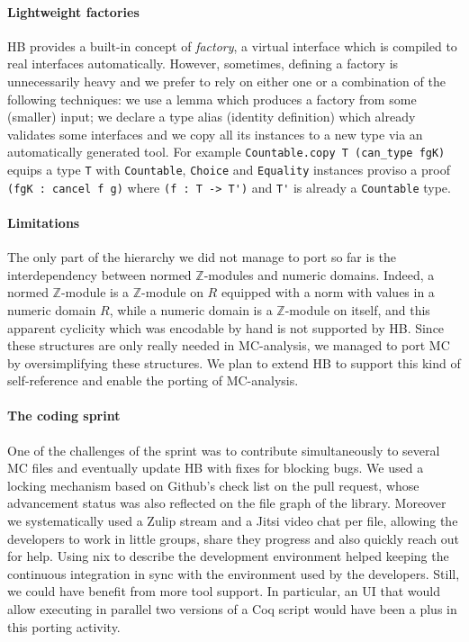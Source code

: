 \documentclass{easychair}
\def\MC{{\sf MC}}
\def\HB{{\sf HB}}
\def\newterm#1{{\it #1}}
\begin{document}
\paragraph{Lightweight factories}

\HB{} provides a built-in concept of \newterm{factory}, a virtual interface which is
compiled to real interfaces automatically. %
However, sometimes, defining a factory is
unnecessarily heavy and we prefer to rely on either one or a combination of the
following techniques: we use a lemma which produces a
factory from some (smaller) input; we declare a type alias (identity definition)
which already validates some interfaces and we copy all its instances to a new
type via an automatically generated tool. For example
\verb+Countable.copy T (can_type fgK)+ equips a type \verb+T+ with
\verb+Countable+, \verb+Choice+ and \verb+Equality+ instances proviso a
proof \verb+(fgK : cancel f g)+ where \verb+(f : T -> T')+ and \verb+T'+
is already a \verb+Countable+ type.

\paragraph{Limitations}

The only part of the hierarchy we did not manage to port so far is the
interdependency between normed $\mathbb{Z}$-modules and numeric domains.
Indeed, a normed $\mathbb{Z}$-module is a $\mathbb{Z}$-module on $R$
equipped with a norm with values in a numeric domain $R$,
while a numeric domain is a $\mathbb{Z}$-module on itself, and this apparent
cyclicity which was encodable by hand is not supported by \HB{}.
Since these structures are only really needed in \MC{}-analysis,
we managed to port \MC{} by oversimplifying these structures.
We plan to extend \HB{} to support this kind of self-reference
and enable the porting of \MC{}-analysis.

\paragraph{The coding sprint}

One of the challenges of the sprint was to contribute simultaneously
to several \MC{} files and eventually update \HB{} with fixes for blocking bugs.
We used a locking mechanism based on Github's check list on the pull request,
whose advancement status was also reflected on the file graph of the library.
Moreover we systematically used a Zulip stream and a Jitsi video chat per file,
allowing the developers to work in little groups, share they progress and
also quickly reach out for help. Using nix to describe the development
environment helped keeping the continuous integration in sync with the
environment used by the developers.
Still, we could have benefit from more tool support. In particular,
an UI that would allow executing in parallel two versions of a Coq script
would have been a plus in this porting activity.
\end{document}

